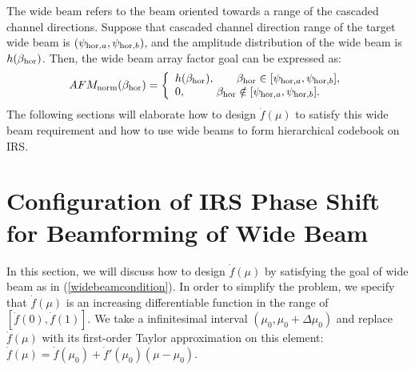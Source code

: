 \documentclass[12pt,draftclsnofoot,onecolumn]{IEEEtran}
\begin{document}
	The wide beam refers to the beam  oriented towards a range of the cascaded channel directions. Suppose that  cascaded channel direction range of the target wide beam is $(\psi_{{\rm hor},a},\psi_{{\rm hor},b}) $, and the amplitude  distribution of the wide beam is $h(\beta_{\rm hor})$. Then, the wide beam array factor goal can be expressed as:
	\begin{equation}\label{widebeamcondition}
		AFM_{\rm norm}({\beta _{\rm hor}}) = \left\{ \begin{array}{l}
			h(\beta_{\rm hor}),\;\;\;\;\;\;\;{\beta _{\rm hor}} \in [{\psi _{{\rm hor},a}},{\psi _{{\rm hor},b}}],\\
			0,\;\;\;\;\;\;\;\;\;\;{\beta _{\rm hor}} \notin [{\psi _{{\rm hor},a}},{\psi _{{\rm hor},b}}].
		\end{array} \right.
	\end{equation}
	The following sections will elaborate how to design $\dot{f}(\mu)$ to satisfy this wide beam requirement and how to use wide beams to form hierarchical codebook on IRS.
	
	
	
	
	
	
	
	
	\section{Configuration of IRS Phase Shift for Beamforming of Wide Beam}
		In this section, we will discuss how to design $\dot{f}(\mu)$ by satisfying the goal of wide beam as in (\ref{widebeamcondition}).
		In order to  simplify the problem, we specify that $\dot{f}(\mu)$ is an  increasing differentiable function in the range of  $[\dot{f}(0), \dot{f}(1)]$. 
		We take a  infinitesimal interval $(\mu_0,\mu_0+\Delta \mu_0)$ and replace $\dot{f}(\mu)$ with its first-order Taylor approximation  on this element: $\dot{f}(\mu)=\dot{f}(\mu_0)+\dot{f}'(\mu_0)(\mu-\mu_0)$.
		
\end{document}
